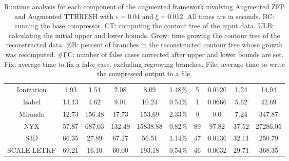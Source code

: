\begin{table}[!ht]
{\begin{tabular}{cccccccccc}
\multicolumn{1}{c|}{Ionization}  & 1.93  & 1.54   & 2.08   & 8.09     & 1.48\% & 5    & 0.0120   & 1.24  & 14.94    \\
\multicolumn{1}{c|}{Isabel}      & 13.13 & 4.62   & 9.01   & 10.24    & 0.54\% & 1    & 0.0666   & 5.62  & 42.69    \\
\multicolumn{1}{c|}{Miranda}     & 12.73 & 156.48 & 17.73  & 153.69   & 2.33\% & 0    & 0.0      & 7.24  & 347.87   \\
\multicolumn{1}{c|}{NYX}         & 57.87 & 687.03 & 132.49 & 15838.88 & 0.82\% & 89   & 97.82    & 37.52 & 27286.05 \\
\multicolumn{1}{c|}{S3D}         & 66.35 & 27.89  & 67.27  & 56.51    & 1.14\% & 47   & 0.0136   & 32.11 & 250.79   \\
\multicolumn{1}{c|}{SCALE-LETKF} & 69.21 & 16.10  & 60.00  & 193.18   & 0.54\% & 46   & 0.0032   & 29.71 & 368.35   \\ \hline
\end{tabular}
}
\vspace{-2mm}
\caption{Runtime analysis for each component of the augmented framework involving Augmented ZFP and Augmented TTHRESH with $\varepsilon = 0.04$ and $\xi = 0.012$. 
All times are in seconds. 
BC: running the base compressor.
CT: computing the contour tree of the input data.
ULB: calculating the initial upper and lower bounds. 
Grow: time growing the contour tree of the reconstructed data.
\%B: percent of branches in the reconstructed contour tree whose growth was recomputed.
\#FC: number of false cases corrected after upper and lower bounds are set.
Fix: average time to fix a false case, excluding regrowing branches.
File: average time to write the compressed output to a file.}
\label{tab:time}
\vspace{-6mm}
\end{table}
